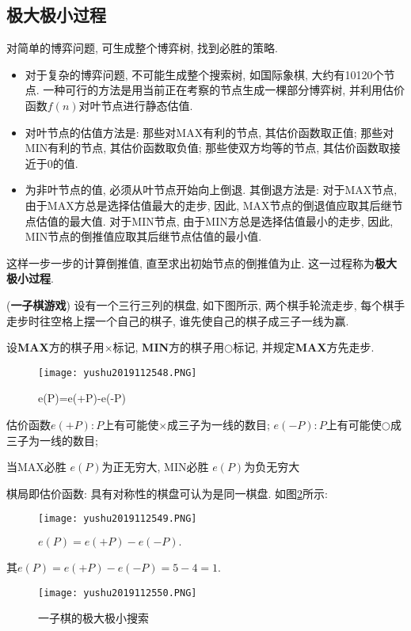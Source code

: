 \subsection{极大极小过程}
对简单的博弈问题, 可生成整个博弈树, 找到必胜的策略.
\begin{itemize}
\item 对于复杂的博弈问题, 不可能生成整个搜索树, 如国际象棋, 大约有10120个节点.  一种可行的方法是用当前正在考察的节点生成一棵部分博弈树, 并利用估价函数$f(n)$对叶节点进行静态估值.
\item 对叶节点的估值方法是: 那些对MAX有利的节点, 其估价函数取正值; 那些对MIN有利的节点, 其估价函数取负值; 那些使双方均等的节点, 其估价函数取接近于0的值.
\item 为非叶节点的值, 必须从叶节点开始向上倒退. 其倒退方法是:  对于MAX节点, 由于MAX方总是选择估值最大的走步, 因此, MAX节点的倒退值应取其后继节点估值的最大值.
       对于MIN节点, 由于MIN方总是选择估值最小的走步, 因此, MIN节点的倒推值应取其后继节点估值的最小值.
\end{itemize}
这样一步一步的计算倒推值, 直至求出初始节点的倒推值为止. 这一过程称为\textbf{极大极小过程}.
\begin{example}
(\textbf{一子棋游戏}) 设有一个三行三列的棋盘, 如下图所示, 两个棋手轮流走步, 每个棋手走步时往空格上摆一个自己的棋子, 谁先使自己的棋子成三子一线为赢.
\end{example}设\textbf{MAX}方的棋子用$\times$标记, \textbf{MIN}方的棋子用$○$标记, 并规定\textbf{MAX}方先走步.
\begin{figure}[H]
\centering
\texttt{[image: yushu2019112548.PNG]}
\caption{e(P)=e(+P)-e(-P)}
\label{AI32fig48}
\end{figure}
\begin{result}
估价函数$e(+P): P$上有可能使$\times$成三子为一线的数目; $e(-P): P$上有可能使$○$成三子为一线的数目;

当\textup{MAX}必胜 $e(P)$为正无穷大, \textup{MIN}必胜 $e(P)$为负无穷大

棋局即估价函数: 具有对称性的棋盘可认为是同一棋盘. 如图\ref{AI32fig49}所示:
\begin{figure}[H]
\centering
\texttt{[image: yushu2019112549.PNG]}
\caption{$e(P)=e(+P)-e(-P).$}
\label{AI32fig49}
\end{figure}
其$e(P)=e(+P)-e(-P)=5-4=1$.
\end{result}
\begin{figure}[H]
\centering
\texttt{[image: yushu2019112550.PNG]}
\caption{一子棋的极大极小搜索}
\label{AI32fig50}
\end{figure}
